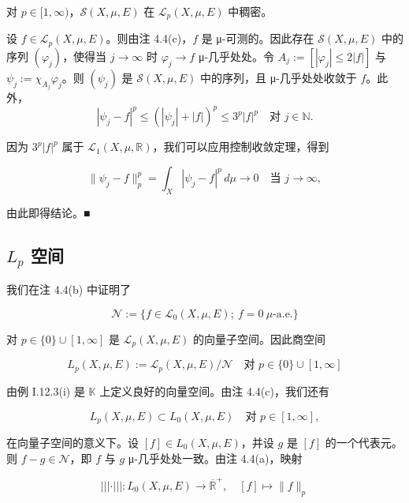 \begin{proposition}

对 $ p \in [1,\infty) $，$ \mathcal{S}(X,\mu,E) $ 在 $ \mathcal{L}_p(X,\mu,E) $ 中稠密。

\proofhead
设 $ f \in \mathcal{L}_p(X,\mu,E) $。则由注 4.4(c)，$ f $ 是 μ-可测的。因此存在 $ \mathcal{S}(X,\mu,E) $ 中的序列 $ (\varphi_j) $，使得当 $ j \to \infty $ 时 $ \varphi_j \to f $ μ-几乎处处。令 $ A_j := [|\varphi_j| \le 2|f|] $ 与 $ \psi_j := \chi_{A_j}\varphi_j $。则 $ (\psi_j) $ 是 $ \mathcal{S}(X,\mu,E) $ 中的序列，且 μ-几乎处处收敛于 $ f $。此外，
\[
|\psi_j - f|^p \le (|\psi_j| + |f|)^p \le 3^p|f|^p \quad \text{对 } j \in \mathbb{N} .
\]

因为 $ 3^p|f|^p $ 属于 $ \mathcal{L}_1(X,\mu,\mathbb{R}) $，我们可以应用控制收敛定理，得到

\[
\|\psi_j - f\|_p^p = \int_X |\psi_j - f|^p\,d\mu \to 0 \quad \text{当 } j \to \infty ,
\]

由此即得结论。\nobreak\hspace{0.35em}■

\end{proposition}

\subsection*{$ L_p $ 空间}

我们在注 4.4(b) 中证明了

\[
\mathcal{N} := \{f \in \mathcal{L}_0(X,\mu,E) ;\ f = 0 \ \mu\text{-a.e.}\}
\]

对 $ p \in \{0\} \cup [1,\infty] $ 是 $ \mathcal{L}_p(X,\mu,E) $ 的向量子空间。因此商空间

\[
L_p(X,\mu,E) := \mathcal{L}_p(X,\mu,E)/\mathcal{N} \quad \text{对 } p \in \{0\} \cup [1,\infty]
\]

由例 I.12.3(i) 是 $ \mathbb{K} $ 上定义良好的向量空间。由注 4.4(c)，我们还有

\[
L_p(X,\mu,E) \subset L_0(X,\mu,E) \quad \text{对 } p \in [1,\infty] ,
\]

在向量子空间的意义下。设 $ [f] \in L_0(X,\mu,E) $，并设 $ g $ 是 $ [f] $ 的一个代表元。则 $ f - g \in \mathcal{N} $，即 $ f $ 与 $ g $ μ-几乎处处一致。由注 4.4(a)，映射

\[
|||\cdot||| : L_0(X,\mu,E) \to \overline{\mathbb{R}}^+ ,\quad [f] \mapsto \|f\|_p
\]

